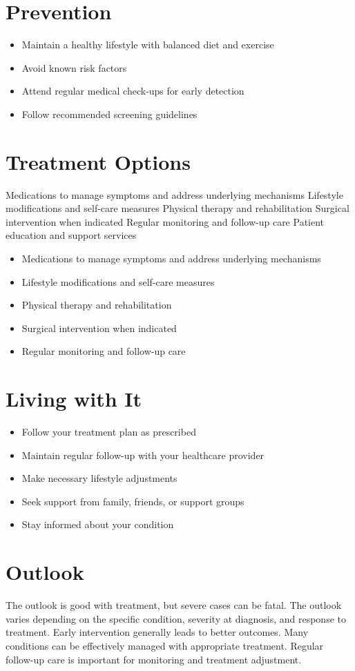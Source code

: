 \section{Prevention}
\begin{itemize}[noitemsep]
  \item Maintain a healthy lifestyle with balanced diet and exercise
  \item Avoid known risk factors
  \item Attend regular medical check-ups for early detection
  \item Follow recommended screening guidelines
\end{itemize}
\section{Treatment Options}
Medications to manage symptoms and address underlying mechanisms Lifestyle modifications and self-care measures Physical therapy and rehabilitation Surgical intervention when indicated Regular monitoring and follow-up care Patient education and support services

\begin{itemize}[noitemsep]
  \item Medications to manage symptoms and address underlying mechanisms
  \item Lifestyle modifications and self-care measures
  \item Physical therapy and rehabilitation
  \item Surgical intervention when indicated
  \item Regular monitoring and follow-up care
\end{itemize}
\section{Living with It}
\begin{itemize}[noitemsep]
  \item Follow your treatment plan as prescribed
  \item Maintain regular follow-up with your healthcare provider
  \item Make necessary lifestyle adjustments
  \item Seek support from family, friends, or support groups
  \item Stay informed about your condition
\end{itemize}
\section{Outlook}
The outlook is good with treatment, but severe cases can be fatal. The outlook varies depending on the specific condition, severity at diagnosis, and response to treatment. Early intervention generally leads to better outcomes. Many conditions can be effectively managed with appropriate treatment. Regular follow-up care is important for monitoring and treatment adjustment.
